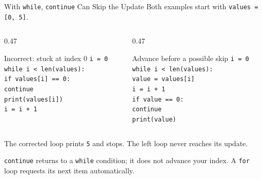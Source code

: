 \documentclass[aspectratio=169,10pt]{beamer}
\begin{document}
\begin{frame}{With \texttt{while}, \texttt{continue} Can Skip the Update}
  \small
  Both examples start with \texttt{values = [0, 5]}.
  \begin{columns}[T,onlytextwidth]
    \begin{column}{0.47\textwidth}
      \begin{alertblock}{Incorrect: stuck at index 0}
        \texttt{i = 0}\\
        \texttt{while i < len(values):}\\
        \hspace{0.18in}\texttt{if values[i] == 0:}\\
        \hspace{0.36in}\texttt{continue}\\
        \hspace{0.18in}\texttt{print(values[i])}\\
        \hspace{0.18in}\texttt{i = i + 1}
      \end{alertblock}
    \end{column}
    \begin{column}{0.47\textwidth}
      \begin{block}{Advance before a possible skip}
        \texttt{i = 0}\\
        \texttt{while i < len(values):}\\
        \hspace{0.18in}\texttt{value = values[i]}\\
        \hspace{0.18in}\texttt{i = i + 1}\\
        \hspace{0.18in}\texttt{if value == 0:}\\
        \hspace{0.36in}\texttt{continue}\\
        \hspace{0.18in}\texttt{print(value)}
      \end{block}
    \end{column}
  \end{columns}
  The corrected loop prints \texttt{5} and stops. The left loop never reaches its update.
  \begin{keyidea}
    \texttt{continue} returns to a \texttt{while} condition; it does not advance your index. A \texttt{for} loop requests its next item automatically.
  \end{keyidea}
\end{frame}
\end{document}
